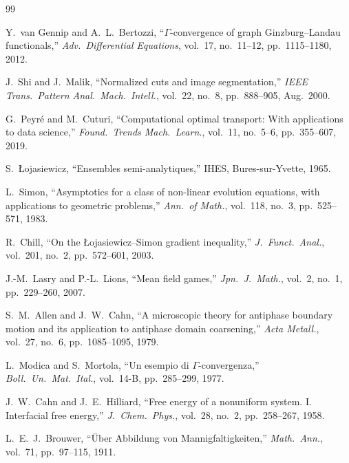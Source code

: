 \documentclass[lettersize,journal]{IEEEtran}
\begin{document}

\begin{thebibliography}{99}

Y.~van Gennip and A.~L.~Bertozzi, ``$\Gamma$-convergence of graph Ginzburg--Landau functionals,'' \emph{Adv.\ Differential Equations}, vol.~17, no.~11--12, pp.~1115--1180, 2012.

J.~Shi and J.~Malik, ``Normalized cuts and image segmentation,'' \emph{IEEE Trans.\ Pattern Anal.\ Mach.\ Intell.}, vol.~22, no.~8, pp.~888--905, Aug.~2000.

G.~Peyr\'{e} and M.~Cuturi, ``Computational optimal transport: With applications to data science,'' \emph{Found.\ Trends Mach.\ Learn.}, vol.~11, no.~5--6, pp.~355--607, 2019.

S.~\L{}ojasiewicz, ``Ensembles semi-analytiques,'' IHES, Bures-sur-Yvette, 1965.

L.~Simon, ``Asymptotics for a class of non-linear evolution equations, with applications to geometric problems,'' \emph{Ann.\ of Math.}, vol.~118, no.~3, pp.~525--571, 1983.

R.~Chill, ``On the \L{}ojasiewicz--Simon gradient inequality,'' \emph{J.\ Funct.\ Anal.}, vol.~201, no.~2, pp.~572--601, 2003.

J.-M.~Lasry and P.-L.~Lions, ``Mean field games,'' \emph{Jpn.\ J.\ Math.}, vol.~2, no.~1, pp.~229--260, 2007.

S.~M.~Allen and J.~W.~Cahn, ``A microscopic theory for antiphase boundary motion and its application to antiphase domain coarsening,'' \emph{Acta Metall.}, vol.~27, no.~6, pp.~1085--1095, 1979.

L.~Modica and S.~Mortola, ``Un esempio di $\Gamma$-convergenza,'' \emph{Boll.\ Un.\ Mat.\ Ital.}, vol.~14-B, pp.~285--299, 1977.

J.~W.~Cahn and J.~E.~Hilliard, ``Free energy of a nonuniform system. I. Interfacial free energy,'' \emph{J.\ Chem.\ Phys.}, vol.~28, no.~2, pp.~258--267, 1958.

L.~E.~J.~Brouwer, ``\"{U}ber Abbildung von Mannigfaltigkeiten,'' \emph{Math.\ Ann.}, vol.~71, pp.~97--115, 1911.


\end{thebibliography}
\end{document}
